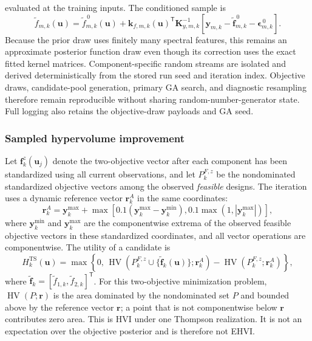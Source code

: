 \documentclass[twoside]{article}
\newcommand{\HV}{\operatorname{HV}}
\begin{document}
evaluated at the training inputs. The conditioned sample is
\nopagebreak[4]
\begin{equation}
  \widetilde f_{m,k}(\mathbf{u})
  =
  \widetilde f_{m,k}^{\,0}(\mathbf{u})
  +\mathbf{k}_{f,m,k}(\mathbf{u})^{\mathsf T}
  \mathbf{K}_{y,m,k}^{-1}
  \left[
  \mathbf{y}_{m,k}
  -\widetilde{\mathbf f}_{m,k}^{\,0}
  -\boldsymbol{\epsilon}_{m,k}^{\,0}
  \right].
  \label{eq:matheron-draw}
\end{equation}
Because the prior draw uses finitely many spectral features, this remains an
approximate posterior function draw even though its correction uses the exact
fitted kernel matrices.
Component-specific random streams are isolated and derived deterministically
from the stored run seed and iteration index. Objective draws, candidate-pool
generation, primary GA search, and diagnostic resampling therefore remain
reproducible without sharing random-number-generator state. Full logging also
retains the objective-draw payloads and GA seed.

\subsubsection{Sampled hypervolume improvement}

Let \(\mathbf f_k^z(\mathbf u_j)\) denote the two-objective vector after each
component has been standardized using all current observations, and let
\(P_k^{F,z}\) be the nondominated standardized objective vectors
among the observed \emph{feasible} designs. The iteration uses a dynamic
reference vector \(\mathbf{r}_k^{A}\) in the same coordinates:
\begin{equation}
  \mathbf{r}_k^{A}
  =
  \mathbf{y}_{k}^{\max}
  +
  \max\!\left[
  0.1(\mathbf{y}_{k}^{\max}-\mathbf{y}_{k}^{\min}),
  0.1\max(1,|\mathbf{y}_{k}^{\max}|)
  \right],
  \label{eq:acquisition-reference}
\end{equation}
where \(\mathbf y_k^{\min}\) and \(\mathbf y_k^{\max}\) are the componentwise
extrema of the observed feasible objective vectors in these standardized
coordinates, and all vector operations are componentwise. The utility of a
candidate is
\begin{equation}
  H_k^{\mathrm{TS}}(\mathbf{u})
  =
  \max\!\left\{0,\,
  \HV\!\left(
  P_k^{F,z}\cup
  \{\widetilde{\mathbf f}_k(\mathbf{u})\};\mathbf{r}_k^{A}
  \right)
  -
  \HV\!\left(P_k^{F,z};\mathbf{r}_k^{A}\right)
  \right\},
  \label{eq:sampled-hvi}
\end{equation}
where
\(\widetilde{\mathbf f}_k=
[\widetilde f_{1,k},\widetilde f_{2,k}]^{\mathsf T}\).
For this two-objective minimization problem,
\(\HV(P;\mathbf r)\) is the area dominated by the nondominated set
\(P\) and bounded above by the reference vector \(\mathbf r\); a point
that is not componentwise below \(\mathbf r\) contributes zero area.
This is HVI under one Thompson realization.  It is not an expectation over
the objective posterior and is therefore not EHVI.
\end{document}

